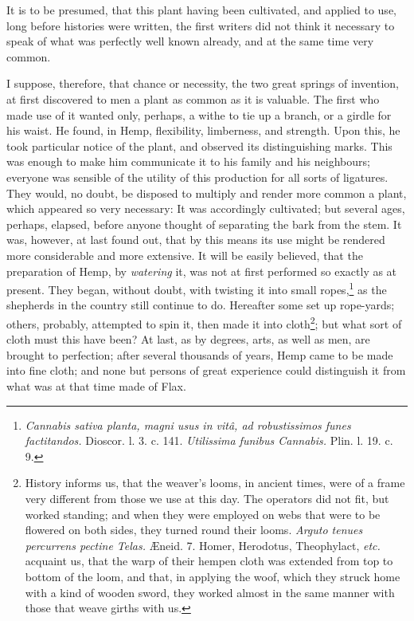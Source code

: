 \documentclass[a4paper, 11pt, oneside, polutonikogreek, english]{article}
\begin{document}
It is to be presumed, that this plant having been cultivated, and applied to use, long before histories were written, the first writers did not think it necessary to speak of what was perfectly well known already, and at the same time very common.

I suppose, therefore, that chance or necessity, the two great springs of invention, at first discovered to men a plant as common as it is valuable. The first who made use of it wanted only, perhaps, a withe to tie up a branch, or a girdle for his waist. He found, in Hemp, flexibility, limberness, and strength. Upon this, he took particular notice of the plant, and observed its distinguishing marks. This was enough to make him communicate it to his family and his neighbours; everyone was sensible of the utility of this production for all sorts of ligatures. They would, no doubt, be disposed to multiply and render more common a plant, which appeared so very necessary: It was accordingly cultivated; but several ages, perhaps, elapsed, before anyone thought of separating the bark from the stem. It was, however, at last found out, that by this means its use might be rendered more considerable and more extensive. It will be easily believed, that the preparation of Hemp, by \emph{watering} it, was not at first performed so exactly as at present. They began, without doubt, with twisting it into small ropes,\footnote{\emph{Cannabis sativa planta, magni usus in vitâ, ad robustissimos funes factitandos.} Dioscor. l. 3. c. 141.  \emph{Utilissima funibus Cannabis.} Plin. l. 19. c. 9.} as the shepherds in the country still continue to do. Hereafter some set up rope-yards; others, probably, attempted to spin it, then made it into cloth\footnote{History informs us, that the weaver's looms, in ancient times, were of a frame very different from those we use at this day. The operators did not fit, but worked standing; and when they were employed on webs that were to be flowered on both sides, they turned round their looms.  \emph{Arguto tenues percurrens pectine Telas.} Æneid. 7.  Homer, Herodotus, Theophylact, \emph{etc.} acquaint us, that the warp of their hempen cloth was extended from top to bottom of the loom, and that, in applying the woof, which they struck home with a kind of wooden sword, they worked almost in the same manner with those that weave girths with us.}; but what sort of cloth must this have been? At last, as by degrees, arts, as well as men, are brought to perfection; after several thousands of years, Hemp came to be made into fine cloth; and none but persons of great experience could distinguish it from what was at that time made of Flax.
\end{document}
